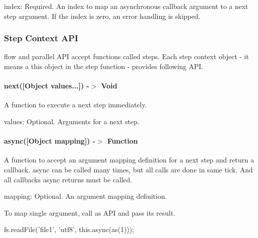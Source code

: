 \begin{DoxyItemize}
\item {\ttfamily index}\+: Required. An index to map an asynchronous callback argument to a next step argument. If the index is zero, an error handling is skipped.
\end{DoxyItemize}

\subsubsection*{Step Context A\+P\+I}

{\ttfamily flow} and {\ttfamily parallel} A\+P\+I accept functions called {\ttfamily step}s. Each step context object -\/ it means a {\ttfamily this} object in the step function -\/ provides following A\+P\+I.

\paragraph*{next(\mbox{[}Object values...\mbox{]}) -\/$>$ Void}

A function to execute a next step immediately.


\begin{DoxyItemize}
\item {\ttfamily values}\+: Optional. Arguments for a next step.
\end{DoxyItemize}

\paragraph*{async(\mbox{[}\+Object mapping\mbox{]}) -\/$>$ Function}

A function to accept an argument mapping definition for a next step and return a callback. {\ttfamily async} can be called many times, but all calls are done in same tick. And all callbacks {\ttfamily async} returns must be called.


\begin{DoxyItemize}
\item {\ttfamily mapping}\+: Optional. An argument mapping definition.
\end{DoxyItemize}

To map single argument, call {\ttfamily as} A\+P\+I and pass its result.


\begin{DoxyCode}
fs.readFile(\textcolor{stringliteral}{'file1'}, \textcolor{stringliteral}{'utf8'}, this.async(as(1)));
\end{DoxyCode}


